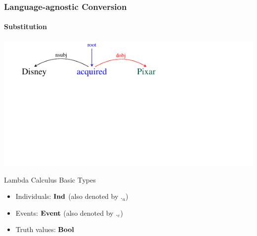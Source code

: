 \documentclass[mathserif,12pt]{beamer}
\newcommand{\itype}{{\bf Ind}}
\newcommand{\etype}{{\bf Event}}
\newcommand{\btype}{{\bf Bool}}
\begin{document}
\begin{frame}
\frametitle{Language-agnostic Conversion}
\framesubtitle{Substitution}
\vspace{-3.3em}
\begin{center}
\includegraphics[trim=2em 9.4em 10em 0em,clip=true,scale=1.3]{figures/pixar_dobj}

\end{center}

\vspace{1cm}

\begin{block}{Lambda Calculus Basic Types}
\begin{itemize}
  \item Individuals: $\itype$ (also denoted by $._a$)
  \item Events: $\etype$ (also denoted by $._e$)
  \item Truth values: $\btype$
\end{itemize}
\end{block}
\end{frame}
\end{document}
